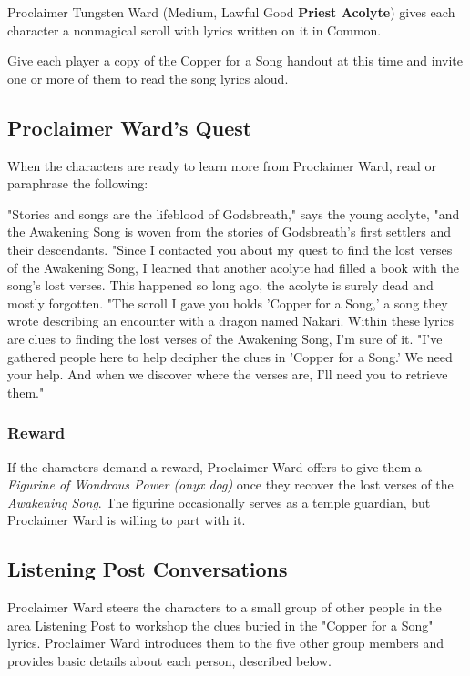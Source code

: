 \documentclass[letterpaper, 11pt, twocolumn]{dndbook}
\begin{document}
Proclaimer Tungsten Ward (Medium, Lawful Good \textbf{Priest Acolyte}) gives each character a nonmagical scroll with lyrics written on it in Common.

Give each player a copy of the Copper for a Song handout at this time and invite one or more of them to read the song lyrics aloud.


\subsection{Proclaimer Ward's Quest}

When the characters are ready to learn more from Proclaimer Ward, read or paraphrase the following:

\begin{DndReadAloud}
"Stories and songs are the lifeblood of Godsbreath," says the young acolyte, "and the Awakening Song is woven from the stories of Godsbreath's first settlers and their descendants. "Since I contacted you about my quest to find the lost verses of the Awakening Song, I learned that another acolyte had filled a book with the song's lost verses. This happened so long ago, the acolyte is surely dead and mostly forgotten. "The scroll I gave you holds 'Copper for a Song,' a song they wrote describing an encounter with a dragon named Nakari. Within these lyrics are clues to finding the lost verses of the Awakening Song, I'm sure of it. "I've gathered people here to help decipher the clues in 'Copper for a Song.' We need your help. And when we discover where the verses are, I'll need you to retrieve them."
\end{DndReadAloud}

\subsubsection{Reward}

If the characters demand a reward, Proclaimer Ward offers to give them a \textit{Figurine of Wondrous Power (onyx dog)} once they recover the lost verses of the \textit{Awakening Song}. The figurine occasionally serves as a temple guardian, but Proclaimer Ward is willing to part with it.

\subsection{Listening Post Conversations}

Proclaimer Ward steers the characters to a small group of other people in the area Listening Post to workshop the clues buried in the "Copper for a Song" lyrics. Proclaimer Ward introduces them to the five other group members and provides basic details about each person, described below.
\end{document}
